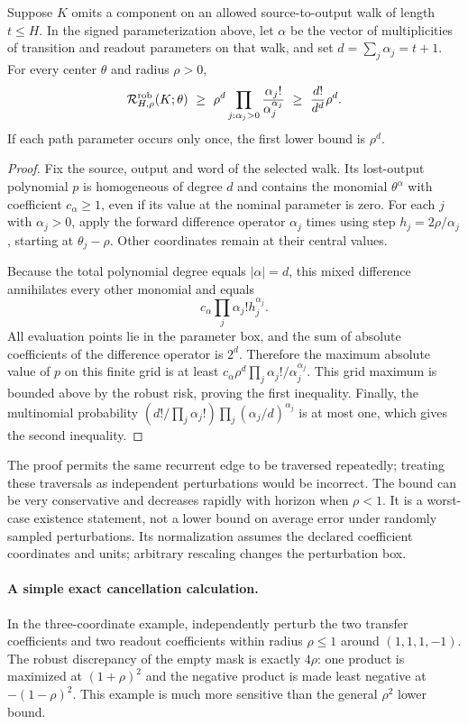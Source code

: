 \begin{theorem}\label{thm:radius}
Suppose $K$ omits a component on an allowed source-to-output walk of length $t\le H$. In the signed parameterization above, let $\alpha$ be the vector of multiplicities of transition and readout parameters on that walk, and set $d=\sum_j\alpha_j=t+1$. For every center $\theta$ and radius $\rho>0$,
\begin{equation}
 \risk_{H,\rho}^{\mathrm{rob}}(K;\theta)
 \ \ge\ \rho^d\prod_{j:\alpha_j>0}\frac{\alpha_j!}{\alpha_j^{\alpha_j}}
 \ \ge\ \frac{d!}{d^d}\rho^d.
 \label{eq:radius}
\end{equation}
If each path parameter occurs only once, the first lower bound is $\rho^d$.
\end{theorem}
\begin{proof}
Fix the source, output and word of the selected walk. Its lost-output polynomial $p$ is homogeneous of degree $d$ and contains the monomial $\theta^\alpha$ with coefficient $c_\alpha\ge1$, even if its value at the nominal parameter is zero. For each $j$ with $\alpha_j>0$, apply the forward difference operator $\alpha_j$ times using step $h_j=2\rho/\alpha_j$, starting at $\theta_j-\rho$. Other coordinates remain at their central values.

Because the total polynomial degree equals $|\alpha|=d$, this mixed difference annihilates every other monomial and equals
\begin{equation}
 c_\alpha\prod_j \alpha_j!h_j^{\alpha_j}.
\end{equation}
All evaluation points lie in the parameter box, and the sum of absolute coefficients of the difference operator is $2^d$. Therefore the maximum absolute value of $p$ on this finite grid is at least
$c_\alpha\rho^d\prod_j\alpha_j!/\alpha_j^{\alpha_j}$.
This grid maximum is bounded above by the robust risk, proving the first inequality. Finally, the multinomial probability
$(d!/\prod_j\alpha_j!)\prod_j(\alpha_j/d)^{\alpha_j}$
is at most one, which gives the second inequality.
\end{proof}
The proof permits the same recurrent edge to be traversed repeatedly; treating these traversals as independent perturbations would be incorrect. The bound can be very conservative and decreases rapidly with horizon when $\rho<1$. It is a worst-case existence statement, not a lower bound on average error under randomly sampled perturbations. Its normalization assumes the declared coefficient coordinates and units; arbitrary rescaling changes the perturbation box.

\paragraph{A simple exact cancellation calculation.} In the three-coordinate example, independently perturb the two transfer coefficients and two readout coefficients within radius $\rho\le1$ around $(1,1,1,-1)$. The robust discrepancy of the empty mask is exactly $4\rho$: one product is maximized at $(1+\rho)^2$ and the negative product is made least negative at $-(1-\rho)^2$. This example is much more sensitive than the general $\rho^2$ lower bound.

